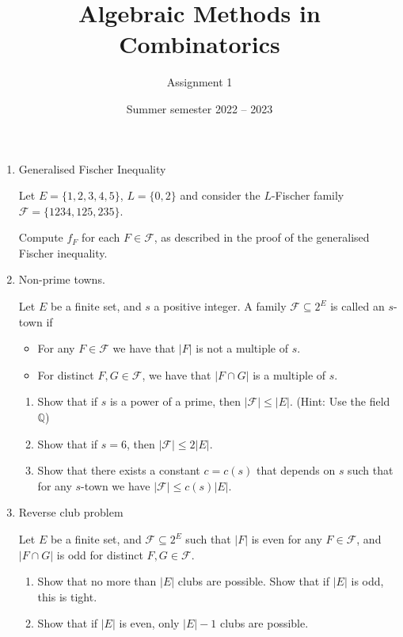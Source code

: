\documentclass[kulak]{tplt}
\title{Algebraic Methods in Combinatorics}
\author{Assignment 1}
\date{Summer semester 2022 -- 2023}
\theoremstyle{definition}
\newcommand{\Q}{\mathbb{Q}}
\newcommand{\FF}{\mathcal F}
\begin{document}
\maketitle
\begin{enumerate}
\item Generalised Fischer Inequality

Let $E = \{1, 2, 3, 4, 5\}$, $L =\{0, 2\}$ and consider the $L$-Fischer family $\FF = \{1234, 125, 235\}$.

Compute $f_F$ for each $F\in \FF$, as described in the proof of the generalised Fischer inequality.


\item Non-prime towns.

Let $E$ be a finite set, and $s$ a positive integer.
A family $\FF \subseteq 2^E$ is called an $s$-town if 
\begin{itemize}
\item For any $F \in \FF$ we have that $|F|$ is not a multiple of $s$.

\item For distinct $F,  G \in \FF$, we have that $|F\cap G|$ is a multiple of $s$.
\end{itemize}

\begin{enumerate}
\item Show that if $s$ is a power of a prime, then $|\FF| \leq |E|$.
(Hint: Use the field $\Q$)

\item Show that if $s = 6$, then $|\FF| \leq 2 |E|$.

\item Show that there exists a constant $c = c(s)$ that depends on $s$ such that for any $s$-town we have $|\FF| \leq c(s) |E|$.
\end{enumerate}



\item Reverse club problem

Let $E$ be a finite set, and $\FF \subseteq 2^E$ such that $|F|$ is even for any $F\in \FF$, and $|F\cap G|$ is odd for distinct $F, G \in \FF$.


\begin{enumerate}

\item Show that no more than $|E|$ clubs are possible. 
Show that if $|E|$ is odd, this is tight.

\item Show that if $|E|$ is even, only $|E| - 1$ clubs are possible.
\end{enumerate}


\end{enumerate}
\end{document}
